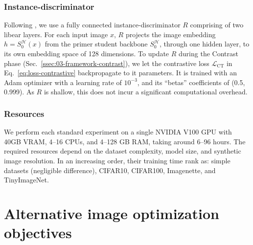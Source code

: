 \subsubsection{Instance-discriminator} \label{sssec:app01-teacherstudents-optimization-instancedisc}
\begin{foldable} %
    Following \citet{fang2021contrastive}, we use a fully connected instance-discriminator $R$ comprising of two libear layers.
    For each input image $x$, $R$ projects the image embedding $h=S_0^{\mathcal{H}}(x)$ from the primer student backbone $S_0^{\mathcal{H}}$, through one hidden layer, to its own embedding space of 128 dimensions.
    To update $R$ during the Contrast phase (Sec.~\ref{ssec:03-framework-contrast}), we let the contrastive loss $\mathcal{L}_{\text{CT}}$ in Eq.~\ref{eq:loss-contrastive} backpropagate to it parameters.
    It is trained with an Adam optimizer \citep{kingma2014adam} with a learning rate of $10^{-3}$, and its ``betas'' coefficients of (0.5, 0.999).
    As $R$ is shallow, this does not incur a significant computational overhead.
\end{foldable}

\subsubsection{Resources} \label{sssec:app01-teacherstudents-optimization-resources}
\begin{foldable} %
    We perform each standard experiment on a single NVIDIA V100 GPU with 40GB VRAM, 4--16 CPUs, and 4--128 GB RAM, taking around 6--96 hours.
    The required resources depend on the dataset complexity, model size, and synthetic image resolution.
    In an increasing order, their training time rank as: simple datasets (negligible difference), CIFAR10, CIFAR100, Imagenette, and TinyImageNet.
\end{foldable}



\section{Alternative image optimization objectives} \label{sec:app02-experiments-multiobjective}
\renewcommand{\thefigure}{B.\arabic{figure}}
\renewcommand{\thetable}{B.\arabic{table}}
\renewcommand{\theequation}{B.\arabic{equation}}
\setcounter{figure}{0}
\setcounter{table}{0}
\setcounter{equation}{0}


